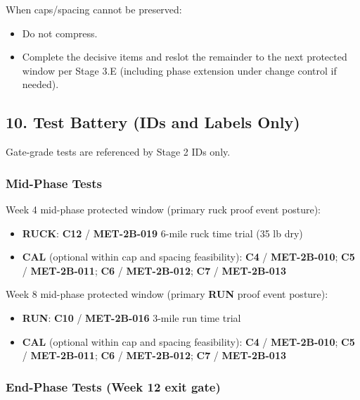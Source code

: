 \documentclass[10pt]{article}
\begin{document}
When caps/spacing cannot be preserved:

\begin{itemize}
\item Do not compress.
\item Complete the decisive items and reslot the remainder to the next protected window per Stage 3.E (including phase extension under change control if needed).
\end{itemize}

\subsection*{10. Test Battery (IDs and Labels Only)}


Gate-grade tests are referenced by Stage 2 IDs only.

\subsubsection*{Mid-Phase Tests}

Week 4 mid-phase protected window (primary ruck proof event posture):

\begin{itemize}
\item \textbf{RUCK}: \textbf{C12} / \textbf{MET-2B-019} 6-mile ruck time trial (35 lb dry)
\item \textbf{CAL} (optional within cap and spacing feasibility): \textbf{C4} / \textbf{MET-2B-010}; \textbf{C5} / \textbf{MET-2B-011}; \textbf{C6} / \textbf{MET-2B-012}; \textbf{C7} / \textbf{MET-2B-013}
\end{itemize}

Week 8 mid-phase protected window (primary \textbf{RUN} proof event posture):

\begin{itemize}
\item \textbf{RUN}: \textbf{C10} / \textbf{MET-2B-016} 3-mile run time trial
\item \textbf{CAL} (optional within cap and spacing feasibility): \textbf{C4} / \textbf{MET-2B-010}; \textbf{C5} / \textbf{MET-2B-011}; \textbf{C6} / \textbf{MET-2B-012}; \textbf{C7} / \textbf{MET-2B-013}
\end{itemize}

\subsubsection*{End-Phase Tests (Week 12 exit gate)}
\end{document}
